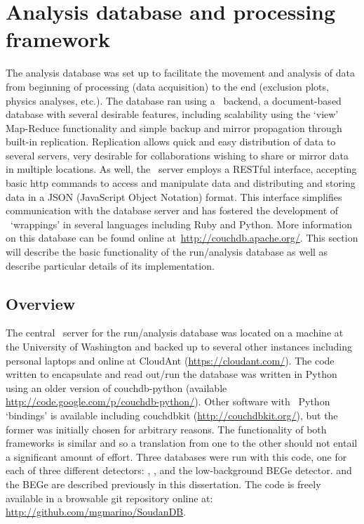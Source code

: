 	\section{Analysis database and processing framework}
	\label{sec:AnalysisDBProcFramework}
	The analysis database was set up to facilitate the movement and analysis of
data from beginning of processing (data acquisition) to the end (exclusion
plots, physics analyses, etc.).  The database ran using a \couchdb~backend, a
document-based database with several desirable features, including scalability
using the `view' Map-Reduce functionality and simple backup and mirror
propagation through built-in replication.  Replication allows quick and easy
distribution of data to several servers, very desirable for collaborations
wishing to share or mirror data in multiple locations.  As well, the \couchdb~server employs a RESTful interface, accepting basic http commands to access and
manipulate data and distributing and storing data in a JSON (JavaScript Object
Notation) format.  This interface simplifies communication with the database
server and has fostered the development of \couchdb~`wrappings' in several
languages including Ruby and Python.  More information on this database can be
found online at~\url{http://couchdb.apache.org/}.  This section will describe
the basic functionality of the run/analysis database as well as describe
particular details of its implementation.  

		\subsection{Overview}
		
	The central \couchdb~server for the run/analysis database was located on a
machine at the University of Washington and backed up to several other
instances including personal laptops and online at CloudAnt
(\url{https://cloudant.com/}).  The code written to encapsulate and read
out/run the database was written in Python using an older version of
couchdb-python (available \url{http://code.google.com/p/couchdb-python/}).
Other software with \couchdb~Python `bindings' is available including couchdbkit
(\url{http://couchdbkit.org/}), but the former was initially chosen for
arbitrary reasons.  The functionality of both frameworks is similar and so a
translation from one to the other should not entail a significant amount of
effort.  Three databases were run with this code, one for each of three
different detectors: , , and the low-background BEGe detector.  
and the BEGe are described previously in this dissertation.  The code is freely
available in a browsable git repository online at:
\url{http://github.com/mgmarino/SoudanDB}.  			

